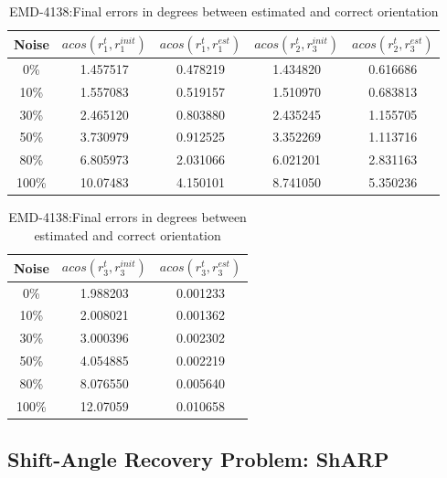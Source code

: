 \documentclass{report}
\begin{document}
\begin{table}[H]
    \centering
     \begin{tabular}{||c c c c c||} 
             \hline
             Noise 
             & $acos(r_1^{t},r_1^{init})$ 
             & $acos(r_1^{t},r_1^{est})$
             & $acos(r_2^{t},r_3^{init})$ 
             & $acos(r_2^{t},r_3^{est})$
            \\ 
            \hline\hline
            0\%  &1.457517&0.478219&1.434820 &0.616686\\ \hline
            10\% &1.557083&0.519157&1.510970 &0.683813\\ \hline
            30\% &2.465120&0.803880&2.435245 &1.155705\\ \hline
            50\% &3.730979&0.912525&3.352269 &1.113716\\ \hline
            80\% &6.805973&2.031066&6.021201 &2.831163\\ \hline
            100\%&10.07483&4.150101&8.741050 &5.350236\\ \hline
            \hline
    \end{tabular}
    \begin{tabular}{||c c c||} 
             \hline
             Noise 
             & $acos(r_3^{t},r_3^{init})$ 
             & $acos(r_3^{t},r_3^{est})$
            \\ 
            \hline\hline
            0\%  &1.988203&0.001233\\ \hline
            10\% &2.008021&0.001362\\ \hline
            30\% &3.000396&0.002302\\ \hline
            50\% &4.054885&0.002219\\ \hline
            80\% &8.076550&0.005640\\ \hline
            100\%&12.07059&0.010658\\ \hline
            \hline
    \end{tabular}
    \caption{EMD-4138:Final errors in degrees between estimated and correct orientation}
    \label{tbl:our_arp_4138_result-acos-rot}
\end{table}

\subsection{Shift-Angle Recovery Problem: ShARP}\label{subsec:ShARP-EXP}
\end{document}
